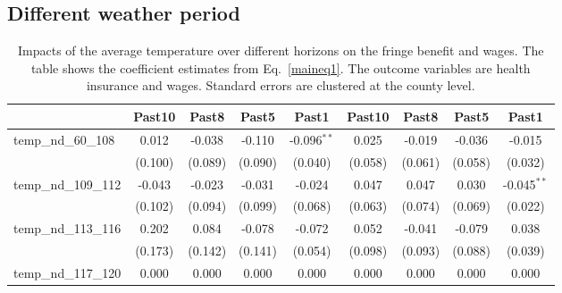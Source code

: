 \documentclass[12pt]{article}
\newcommand{\sym}[1]{\ensuremath{^{#1}}}
\begin{document}
\begin{appendices}
\subsection{Different weather period}
\begin{table}[h!]
\caption{Impacts of the average temperature over different horizons on the fringe benefit and wages. The table shows the coefficient estimates from Eq.~\ref{maineq1}. The outcome variables are health insurance and wages. Standard errors are clustered at the county level.}
\label{tab:weatherperiod}
\centering
\scriptsize
\begin{tabular}{l*{8}{c}}
\hline\hline
                    &\multicolumn{1}{c}{Past10}&\multicolumn{1}{c}{Past8}&\multicolumn{1}{c}{Past5}&\multicolumn{1}{c}{Past1}&\multicolumn{1}{c}{Past10}&\multicolumn{1}{c}{Past8}&\multicolumn{1}{c}{Past5}&\multicolumn{1}{c}{Past1}\\
\hline
temp\_nd\_60\_108      &       0.012         &      -0.038         &      -0.110         &      -0.096\sym{**} &       0.025         &      -0.019         &      -0.036         &      -0.015         \\
                    &     (0.100)         &     (0.089)         &     (0.090)         &     (0.040)         &     (0.058)         &     (0.061)         &     (0.058)         &     (0.032)         \\
temp\_nd\_109\_112     &      -0.043         &      -0.023         &      -0.031         &      -0.024         &       0.047         &       0.047         &       0.030         &      -0.045\sym{**} \\
                    &     (0.102)         &     (0.094)         &     (0.099)         &     (0.068)         &     (0.063)         &     (0.074)         &     (0.069)         &     (0.022)         \\
temp\_nd\_113\_116     &       0.202         &       0.084         &      -0.078         &      -0.072         &       0.052         &      -0.041         &      -0.079         &       0.038         \\
                    &     (0.173)         &     (0.142)         &     (0.141)         &     (0.054)         &     (0.098)         &     (0.093)         &     (0.088)         &     (0.039)         \\
temp\_nd\_117\_120     &       0.000         &       0.000         &       0.000         &       0.000         &       0.000         &       0.000         &       0.000         &       0.000         \\

\end{tabular}
\end{table}
\end{appendices}
\end{document}

